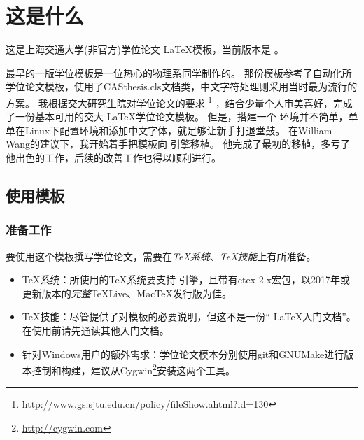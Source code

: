 
\chapter{这是什么}
\label{chap:intro}

\hspace{2em}这是上海交通大学(非官方)学位论文 \LaTeX\cite{companion}模板，当前版本是 \version 。

\hspace{2em}最早的一版学位模板是一位热心的物理系同学制作的。
那份模板参考了自动化所学位论文模板，使用了CASthesis.cls文档类，中文字符处理则采用当时最为流行的 \CJKLaTeX 方案。
我根据交大研究生院对学位论文的要求
\footnote{\url{http://www.gs.sjtu.edu.cn/policy/fileShow.ahtml?id=130}}
，结合少量个人审美喜好，完成了一份基本可用的交大 \LaTeX 学位论文模板。
但是，搭建一个 \CJKLaTeX 环境并不简单，单单在Linux下配置环境和添加中文字体，就足够让新手打退堂鼓。
在William Wang的建议下，我开始着手把模板向 \XeTeX 引擎移植。
他完成了最初的移植，多亏了他出色的工作，后续的改善工作也得以顺利进行。

\section{使用模板}

\subsection{准备工作}
\label{sec:requirements}

要使用这个模板撰写学位论文，需要在\emph{TeX系统}、\emph{TeX技能}上有所准备。

\begin{itemize}[noitemsep,topsep=0pt,parsep=0pt,partopsep=0pt]
	\item {\TeX}系统：所使用的{\TeX}系统要支持 \XeTeX 引擎，且带有ctex 2.x宏包，以2017年或更新版本的\emph{完整}TeXLive、MacTeX发行版为佳。
	\item TeX技能：尽管提供了对模板的必要说明，但这不是一份“ \LaTeX 入门文档”。在使用前请先通读其他入门文档。
	\item 针对Windows用户的额外需求：学位论文模本分别使用git和GNUMake进行版本控制和构建，建议从Cygwin\footnote{\url{http://cygwin.com}}安装这两个工具。
\end{itemize}

